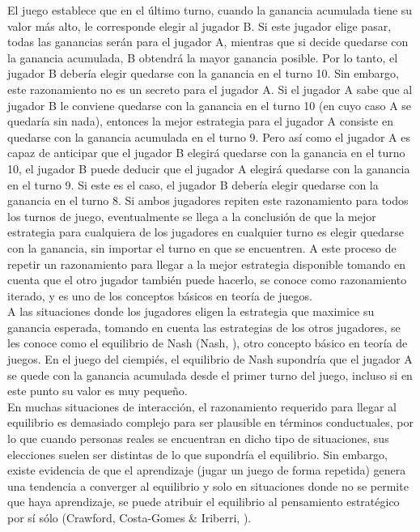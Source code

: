 El juego establece que en el último turno, cuando la ganancia acumulada tiene su valor más alto, le corresponde elegir al jugador B. Si este jugador elige pasar, todas las ganancias serán para el jugador A, mientras que si decide quedarse con la ganancia acumulada, B obtendrá la mayor ganancia posible. Por lo tanto, el jugador B debería elegir quedarse con la ganancia en el turno 10. Sin embargo, este razonamiento no es un secreto para el jugador A. Si el jugador A sabe que al jugador B le conviene quedarse con la ganancia en el turno 10 (en cuyo caso A se quedaría sin nada), entonces la mejor estrategia para el jugador A consiste en quedarse con la ganancia acumulada en el turno 9. Pero así como el jugador A es capaz de anticipar que el jugador B elegirá quedarse con la ganancia en el turno 10, el jugador B puede deducir que el jugador A elegirá quedarse con la ganancia en el turno 9. Si este es el caso, el jugador B debería elegir quedarse con la ganancia en el turno 8. Si ambos jugadores repiten este razonamiento para todos los turnos de juego, eventualmente se llega a la conclusión de que la mejor estrategia para cualquiera de los jugadores en cualquier turno es elegir quedarse con la ganancia, sin importar el turno en que se encuentren. A este proceso de repetir un razonamiento para llegar a la mejor estrategia disponible tomando en cuenta que el otro jugador también puede hacerlo, se conoce como razonamiento iterado, y es uno de los conceptos básicos en teoría de juegos.\\

A las situaciones donde los jugadores eligen la estrategia que maximice su ganancia esperada, tomando en cuenta las estrategias de los otros jugadores, se les conoce como el equilibrio de Nash (Nash, \citeyear{Nash}), otro concepto básico en teoría de juegos. En el juego del ciempiés, el equilibrio de Nash supondría que el jugador A se quede con la ganancia acumulada desde el primer turno del juego, incluso si en este punto su valor es muy pequeño.\\

En muchas situaciones de interacción, el razonamiento requerido para llegar al equilibrio es demasiado complejo para ser plausible en términos conductuales, por lo que cuando personas reales se encuentran en dicho tipo de situaciones, sus elecciones suelen ser distintas de lo que supondría el equilibrio. Sin embargo, existe evidencia de que el aprendizaje (jugar un juego de forma repetida) genera una tendencia a converger al equilibrio y solo en situaciones donde no se permite que haya aprendizaje, se puede atribuir el equilibrio al pensamiento estratégico por sí sólo (Crawford, Costa-Gomes & Iriberri, \citeyear{Crawford}).\\

